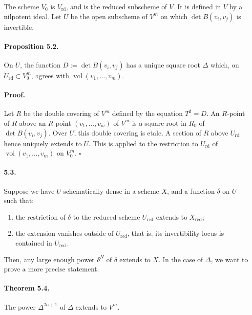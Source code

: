 \documentclass[11pt]{article}
\newcommand{\rd}{\mathrm{rd}}
\newcommand{\red}{\mathrm{red}}
\begin{document}
The scheme $V_0$ is $V_{\rd}$, and is the reduced subscheme of $V$. It is defined in $V$ by a nilpotent ideal. Let $U$ be the open subscheme of $V^m$ on which $\det B(v_i,v_j)$ is invertible.

\paragraph{Proposition 5.2.}
On $U$, the function $D:=\det B(v_i,v_j)$ has a unique square root $\Delta$ which, on $U_{\rd}\subset V_0^m$, agrees with $\operatorname{vol}(v_1,\ldots,v_m)$.

\paragraph{Proof.}
Let $R$ be the double covering of $V^m$ defined by the equation $T^2=D$. An $R$-point of $R$ above an $R$-point $(v_1,\ldots,v_m)$ of $V^m$ is a square root in $R_0$ of $\det B(v_i,v_j)$. Over $U$, this double covering is etale. A section of $R$ above $U_{\rd}$ hence uniquely extends to $U$. This is applied to the restriction to $U_{\rd}$ of $\operatorname{vol}(v_1,\ldots,v_m)$ on $V_0^m$. \hfill $\square$

\paragraph{5.3.}
Suppose we have $U$ schematically dense in a scheme $X$, and a function $\delta$ on $U$ such that:
\begin{enumerate}[label=(\alph*)]
\item the restriction of $\delta$ to the reduced scheme $U_{\red}$ extends to $X_{\red}$;
\item the extension vanishes outside of $U_{\red}$, that is, its invertibility locus is contained in $U_{\red}$.
\end{enumerate}
Then, any large enough power $\delta^N$ of $\delta$ extends to $X$. In the case of $\Delta$, we want to prove a more precise statement.

\paragraph{Theorem 5.4.}
The power $\Delta^{2n+1}$ of $\Delta$ extends to $V^m$.
\end{document}
